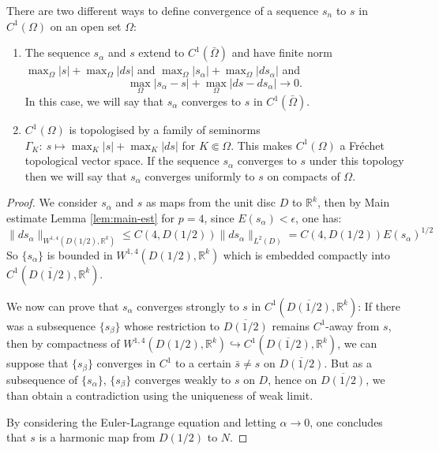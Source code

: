 \begin{remark}
\label{rem:topo-C1}
There are two different ways to define convergence of a sequence \(s_n\) to \(s\) in
\(C^1(\Omega)\) on an open set \(\Omega\):
\begin{enumerate}
\item The sequence \(s_\alpha\) and \(s\) extend to \(C^1(\bar\Omega)\) and have finite norm \(\max_\Omega |s| +
   \max_\Omega|ds|\) and \(\max_\Omega |s_\alpha| + \max_\Omega|ds_\alpha|\) and
\[
     \max_\Omega |s_\alpha - s| + \max_\Omega |ds-ds_\alpha| \to 0.
   \]
In this case, we will say that \(s_\alpha\) converges to \(s\) in \(C^1(\bar\Omega)\).
\item \(C^1(\Omega)\) is topologised by a family of seminorms
\(\Gamma_K:\ s\longmapsto \max_{K} |s| + \max_{K}|ds|\)
for \(K\Subset\Omega\). This makes \(C^1(\Omega)\) a Fréchet topological vector space.
If the sequence \(s_\alpha\) converges to \(s\) under this topology then we will
say that \(s_\alpha\) converges uniformly to \(s\) on compacts of \(\Omega\).
\end{enumerate}
\end{remark}

\begin{proof}
We consider \(s_\alpha\) and \(s\) as maps from the unit disc \(D\) to \(\mathbb{R}^k\), then by Main estimate Lemma \ref{lem:main-est} for \(p=4\), since \(E(s_\alpha) < \epsilon\), one has:
\[
\|ds_\alpha\|_{W^{1,4}(D(1/2), \mathbb{R}^k)} \leq C(4, D(1/2)) \| ds_\alpha\|_{L^2(D)} =
C(4, D(1/2)) E(s_\alpha)^{1/2}
\]
So \(\{s_\alpha\}\) is bounded in \(W^{1,4}(D(1/2), \mathbb{R}^k)\) which is embedded
compactly into \(C^1(\overline{D(1/2)}, \mathbb{R}^k)\).

We now can prove that \(s_\alpha\) converges strongly to \(s\) in \(C^1(\overline{D(1/2)},\mathbb{R}^k)\): If there was a subsequence \(\{s_\beta\}\)
whose restriction to \(\overline{D(1/2)}\) remains \(C^1\)-away from \(s\), then by compactness of \(W^{1,4}(D(1/2),
\mathbb{R}^k) \hookrightarrow C^1(\overline{D(1/2)}, \mathbb{R}^k)\), we can suppose that \(\{s_\beta\}\) converges in \(C^1\) to a certain \(\bar s\ne s\) on \(\overline{D(1/2)}\). But as a
subsequence of \(\{s_\alpha\}\), \(\{s_\beta\}\) converges weakly to \(s\) on \(D\), hence on \(\overline{D(1/2)}\), we than obtain a contradiction using the uniqueness of
weak limit.

By considering the Euler-Lagrange equation and letting \(\alpha\to 0\), one concludes
that \(s\) is a harmonic map from \(D(1/2)\) to \(N\).
\end{proof}

